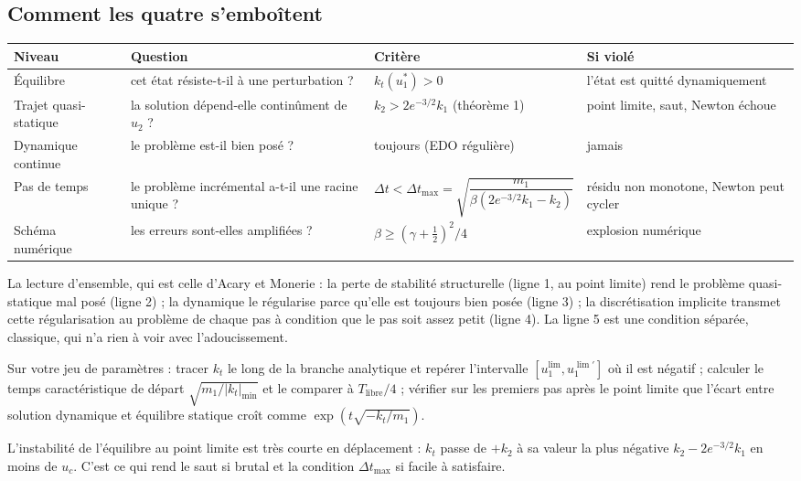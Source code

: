 \documentclass[11pt,a4paper]{article}
\newcommand{\uc}{u_c}
\begin{document}
\subsection{Comment les quatre s'emboîtent}
\begin{center}
\begin{tabular}{@{}p{2.3cm}p{4.0cm}p{5.0cm}p{3.1cm}@{}}
\toprule
Niveau & Question & Critère & Si violé\\
\midrule
Équilibre & cet état résiste-t-il à une perturbation ? & $k_t(u_1^*) > 0$ & l'état est quitté dynamiquement\\
Trajet quasi-statique & la solution dépend-elle continûment de $u_2$ ? & $k_2 > 2e^{-3/2}k_1$ (théorème 1) & point limite, saut, Newton échoue\\
Dynamique continue & le problème est-il bien posé ? & toujours (EDO régulière) & jamais\\
Pas de temps & le problème incrémental a-t-il une racine unique ? & $\Delta t < \Delta t_{\max} = \sqrt{\dfrac{m_1}{\beta(2e^{-3/2}k_1-k_2)}}$ & résidu non monotone, Newton peut cycler\\
Schéma numérique & les erreurs sont-elles amplifiées ? & $\beta\ge(\gamma+\tfrac12)^2/4$ & explosion numérique\\
\bottomrule
\end{tabular}
\end{center}
La lecture d'ensemble, qui est celle d'Acary et Monerie : la perte de stabilité structurelle
(ligne 1, au point limite) rend le problème quasi-statique mal posé (ligne 2) ; la dynamique
le régularise parce qu'elle est toujours bien posée (ligne 3) ; la discrétisation implicite
transmet cette régularisation au problème de chaque pas à condition que le pas soit assez petit
(ligne 4). La ligne 5 est une condition séparée, classique, qui n'a rien à voir avec
l'adoucissement.

\begin{alamain}
Sur votre jeu de paramètres : tracer $k_t$ le long de la branche analytique et repérer
l'intervalle $[u_1^{\lim},u_1^{\lim\prime}]$ où il est négatif ; calculer le temps caractéristique
de départ $\sqrt{m_1/|k_t|_{\min}}$ et le comparer à $T_{\text{libre}}/4$ ; vérifier sur les premiers
pas après le point limite que l'écart entre solution dynamique et équilibre statique croît
comme $\exp(t\sqrt{-k_t/m_1})$.
\end{alamain}

\begin{idee}
L'instabilité de l'équilibre au point limite est très courte en déplacement : $k_t$ passe de
$+k_2$ à sa valeur la plus négative $k_2 - 2e^{-3/2}k_1$ en moins de $\uc$. C'est ce qui rend le
saut si brutal et la condition $\Delta t_{\max}$ si facile à satisfaire.
\end{idee}
\end{document}
